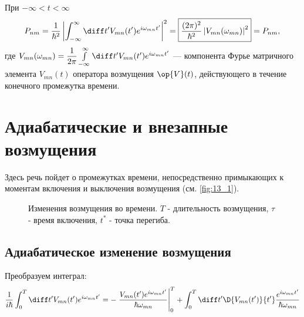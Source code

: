 При $-\infty < t < \infty$
$$
P_{nm} = \frac{1}{\hbar^2} \left | \int_{-\infty}^\infty \diff t' V_{mn}(t')e^{i \omega_{mn}t'} \right |^2 = \boxed{\frac{(2\pi)^2}{\hbar^2} \left | V_{mn}(\omega_{mn})\right|^2} = P_{nm},
$$
где $V_{mn}(\omega_{mn}) = \dfrac{1}{2\pi} \int \limits_{-\infty}^\infty \diff t' V_{mn}(t') e^{i\omega_{mn}t'}$ --- компонента Фурье матричного элемента $V_{mn}(t)$ оператора возмущения $\op{V}(t)$, действующего в течение конечного промежутка времени.

\section{Адиабатические и внезапные возмущения}

Здесь речь пойдет о промежутках времени, непосредственно примыкающих к моментам включения и выключения возмущения (см. \autoref{fig:13_1}).
\begin{figure}[h!]
\centering
{}
\caption{Изменения возмущения во времени. $T$ - длительность возмущения, $\tau$ - время включения, $t^*$ - точка перегиба.} \label{fig:13_1}
\end{figure}

\subsection{Адиабатическое изменение возмущения}

Преобразуем интеграл:
\begin{eqnarray*}
\frac{1}{i\hbar} \int_0^T \diff t' V_{mn}(t')e^{i\omega_{mn}t'} = -\left. \frac{V_{mn}(t')e^{i \omega_{mn}t'}}{\hbar \omega_{mn}}\right|_0^T + \int_0^T \diff t' \D{V_{mn}(t')}{t'} \frac{e^{i\omega_{mn}t'}}{\hbar \omega_{mn}}
\end{eqnarray*}

